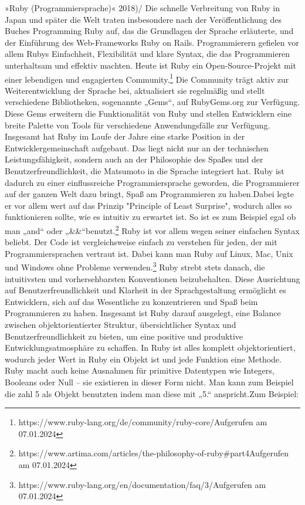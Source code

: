 \documentclass{article}
\begin{document}
{»Ruby (Programmiersprache)« 2018)/} Die schnelle Verbreitung von Ruby in Japan und später die Welt traten insbesondere nach der Veröffentlichung des Buches Programming Ruby auf, das die Grundlagen der Sprache erläuterte, und der Einführung des Web-Frameworks Ruby on Rails. Programmierern gefielen vor allem Rubys Einfachheit, Flexibilität und klare Syntax, die das Programmieren unterhaltsam und effektiv machten. Heute ist Ruby ein Open-Source-Projekt mit einer lebendigen und engagierten Community.\footnote{https://www.ruby-lang.org/de/community/ruby-core/Aufgerufen am 07.01.2024} Die Community trägt aktiv zur Weiterentwicklung der Sprache bei, aktualisiert sie regelmäßig und stellt verschiedene Bibliotheken, sogenannte „Gems“, auf RubyGems.org zur Verfügung. Diese Gems erweitern die Funktionalität von Ruby und stellen Entwicklern eine breite Palette von Tools für verschiedene Anwendungsfälle zur Verfügung. Insgesamt hat Ruby im Laufe der Jahre eine starke Position in der Entwicklergemeinschaft aufgebaut. Das liegt nicht nur an der technischen Leistungsfähigkeit, sondern auch an der Philosophie des Spaßes und der Benutzerfreundlichkeit, die Matsumoto in die Sprache integriert hat. Ruby ist dadurch zu einer einflussreiche Programmiersprache geworden, die Programmierer auf der ganzen Welt dazu bringt, Spaß am Programmieren zu haben.Dabei legte er vor allem wert auf das Prinzip "Principle of Least Surprise", wodurch alles so funktionieren sollte, wie es intuitiv zu erwartet ist. So ist es zum Beispiel egal ob man „and“ oder „\&\&“benutzt.\footnote{https://www.artima.com/articles/the-philosophy-of-ruby\#part4Aufgerufen am 07.01.2024}
Ruby ist vor allem wegen seiner einfachen Syntax beliebt. Der Code ist vergleichsweise einfach zu verstehen für jeden, der mit Programmiersprachen vertraut ist. Dabei kann man Ruby auf Linux, Mac, Unix und Windows ohne Probleme verwenden.\footnote{https://www.ruby-lang.org/en/documentation/faq/3/Aufgerufen am 07.01.2024}
Ruby strebt stets danach, die intuitivsten und vorhersehbarsten Konventionen beizubehalten. Diese Ausrichtung auf Benutzerfreundlichkeit und Klarheit in der Sprachgestaltung ermöglicht es Entwicklern, sich auf das Wesentliche zu konzentrieren und Spaß beim Programmieren zu haben. Insgesamt ist Ruby darauf ausgelegt, eine Balance zwischen objektorientierter Struktur, übersichtlicher Syntax und Benutzerfreundlichkeit zu bieten, um eine positive und produktive Entwicklungsatmosphäre zu schaffen.
In Ruby ist alles komplett objektorientiert, wodurch jeder Wert in Ruby ein Objekt ist und jede Funktion eine Methode. Ruby macht auch keine Ausnahmen für primitive Datentypen wie Integers, Booleans oder Null – sie existieren in dieser Form nicht. Man kann zum Beispiel die zahl 5 als Objekt benutzten indem man diese mit „5.“ anspricht.Zum Beispiel:
\end{document}
